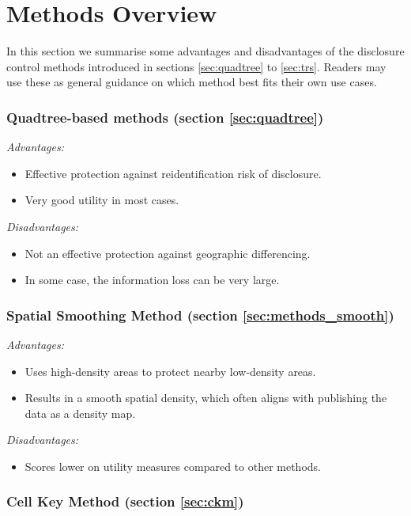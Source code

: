 \section{Methods Overview} \label{sec:strengthweak}

In this section we summarise some advantages and disadvantages of the disclosure control methods introduced in sections \ref{sec:quadtree} to \ref{sec:trs}. Readers may use these as general guidance on which method best fits their own use cases.

\subsubsection{Quadtree-based methods (section \ref{sec:quadtree})}

 \noindent\emph{Advantages:}
\begin{itemize}
    \item Effective protection against reidentification risk of disclosure.
    \item Very good utility in most cases.
\end{itemize}

\noindent\emph{Disadvantages:}
\begin{itemize}
    \item Not an effective protection against geographic differencing.
    \item In some case, the information loss can be very large.
\end{itemize}


 \subsubsection{Spatial Smoothing Method (section \ref{sec:methods_smooth})}
 
 \noindent\emph{Advantages:}
\begin{itemize}
    \item Uses high-density areas to protect nearby low-density areas.
    \item Results in a smooth spatial density, which often aligns with publishing the data as a density map.
\end{itemize}

\noindent\emph{Disadvantages:}
\begin{itemize}
    \item Scores lower on utility measures compared to other methods.
\end{itemize}

\subsubsection{Cell Key Method (section \ref{sec:ckm})}

